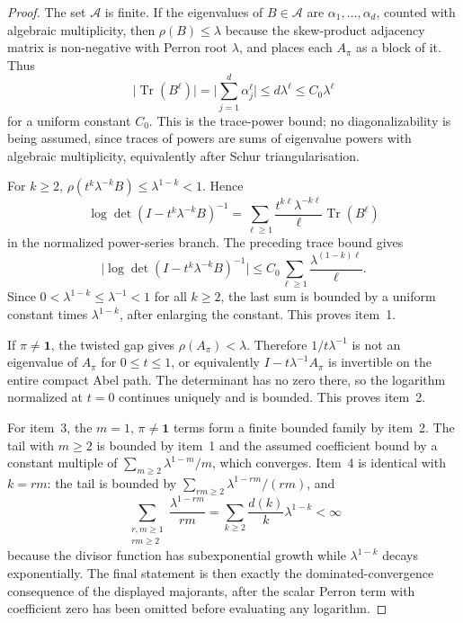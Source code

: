 \documentclass[11pt,a4paper]{amsart}
\theoremstyle{plain}
\theoremstyle{definition}
\theoremstyle{remark}
\DeclareMathOperator{\Tr}{Tr}
\newcommand{\abs}[1]{\lvert #1 \rvert}
\begin{document}
\begin{proof}
  The set \(\mathscr A\) is finite. If the eigenvalues of
  \(B\in\mathscr A\) are \(\alpha_1,\ldots,\alpha_d\), counted with
  algebraic multiplicity, then
  \(\rho(B)\le\lambda\) because the skew-product adjacency matrix is
  non-negative with Perron root \(\lambda\), and
   places each
  \(A_\pi\) as a block of it. Thus
  \[
    \abs{\Tr(B^\ell)}
    =\abs{\sum_{j=1}^d\alpha_j^\ell}
    \le d\lambda^\ell
    \le C_0\lambda^\ell
  \]
  for a uniform constant \(C_0\). This is the trace-power bound; no
  diagonalizability is being assumed, since traces of powers are sums of
  eigenvalue powers with algebraic multiplicity, equivalently after Schur
  triangularisation.

  For \(k\ge2\),
  \(\rho(t^k\lambda^{-k}B)\le\lambda^{1-k}<1\). Hence
  \[
    \log\det(I-t^k\lambda^{-k}B)^{-1}
    =\sum_{\ell\ge1}
      \frac{t^{k\ell}\lambda^{-k\ell}}{\ell}\Tr(B^\ell)
  \]
  in the normalized power-series branch. The preceding trace bound gives
  \[
    \abs{\log\det(I-t^k\lambda^{-k}B)^{-1}}
    \le C_0\sum_{\ell\ge1}\frac{\lambda^{(1-k)\ell}}{\ell}.
  \]
  Since \(0<\lambda^{1-k}\le\lambda^{-1}<1\) for all \(k\ge2\), the last
  sum is bounded by a uniform constant times \(\lambda^{1-k}\), after
  enlarging the constant. This proves item~1.

  If \(\pi\neq\mathbf1\), the twisted gap gives
  \(\rho(A_\pi)<\lambda\). Therefore
  \(1/t\lambda^{-1}\) is not an eigenvalue of \(A_\pi\) for
  \(0\le t\le1\), or equivalently \(I-t\lambda^{-1}A_\pi\) is invertible
  on the entire compact Abel path. The determinant has no zero there, so
  the logarithm normalized at \(t=0\) continues uniquely and is bounded.
  This proves item~2.

  For item~3, the \(m=1\), \(\pi\neq\mathbf1\) terms form a finite bounded
  family by item~2. The tail with \(m\ge2\) is bounded by item~1 and the
  assumed coefficient bound by a constant multiple of
  \(\sum_{m\ge2}\lambda^{1-m}/m\), which converges. Item~4 is identical
  with \(k=rm\): the tail is bounded by
  \(\sum_{rm\ge2}\lambda^{1-rm}/(rm)\), and
  \[
    \sum_{\substack{r,m\ge1\\rm\ge2}}\frac{\lambda^{1-rm}}{rm}
    =\sum_{k\ge2}\frac{d(k)}{k}\lambda^{1-k}<\infty
  \]
  because the divisor function has subexponential growth while
  \(\lambda^{1-k}\) decays exponentially. The final statement is then
  exactly the dominated-convergence consequence of the displayed
  majorants, after the scalar Perron term with coefficient zero has been
  omitted before evaluating any logarithm.
\end{proof}
\end{document}
